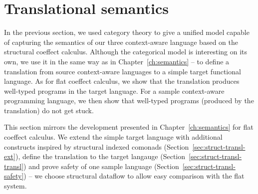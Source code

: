 %
%

\section{Translational semantics}
\label{sec:struct-transl}

In the previous section, we used category theory to give a unified model capable of capturing
the semantics of our three context-aware language based on the structural coeffect calculus.
Although the categorical model is interesting on its own, we use it in the same way as in
Chapter~\ref{ch:semantics} -- to define a translation from source context-aware languages to a
simple target functional language. As for flat coeffect calculus, we show that the translation
produces well-typed programs in the target language. For a sample context-aware programming
language, we then show that well-typed programs (produced by the translation) do not get stuck.

This section mirrors the development presented in Chapter~\ref{ch:semantics} for flat coeffect
calculus. We extend the simple target language with additional constructs inspired by structural
indexed comonads (Section~\ref{sec:struct-transl-ext}), define the translation to the target
langauge (Section~\ref{sec:struct-transl-transl}) and prove safety of one sample language
(Section~\ref{sec:struct-transl-safety}) -- we choose structural dataflow to allow easy
comparison with the flat system.


